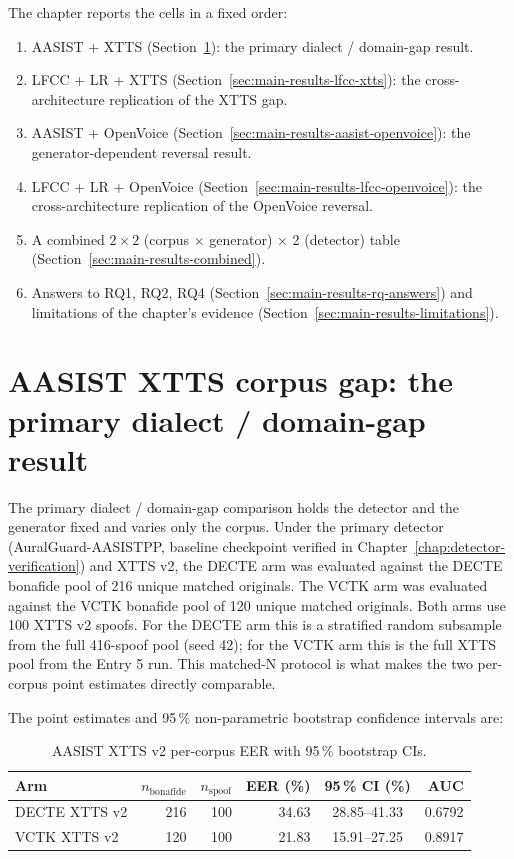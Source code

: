 The chapter reports the cells in a fixed order:

\begin{enumerate}
    \item AASIST + XTTS (Section~\ref{sec:main-results-aasist-xtts}): the primary dialect / domain-gap
        result.
    \item LFCC + LR + XTTS (Section~\ref{sec:main-results-lfcc-xtts}): the cross-architecture
        replication of the XTTS gap.
    \item AASIST + OpenVoice (Section~\ref{sec:main-results-aasist-openvoice}): the generator-dependent
        reversal result.
    \item LFCC + LR + OpenVoice (Section~\ref{sec:main-results-lfcc-openvoice}): the cross-architecture
        replication of the OpenVoice reversal.
    \item A combined $2 \times 2$ (corpus $\times$ generator) $\times$ 2 (detector) table
        (Section~\ref{sec:main-results-combined}).
    \item Answers to RQ1, RQ2, RQ4 (Section~\ref{sec:main-results-rq-answers}) and limitations of the
        chapter's evidence (Section~\ref{sec:main-results-limitations}).
\end{enumerate}


\section{AASIST XTTS corpus gap: the primary dialect / domain-gap result}
\label{sec:main-results-aasist-xtts}

The primary dialect / domain-gap comparison holds the detector and
the generator fixed and varies only the corpus. Under the primary
detector (AuralGuard-AASISTPP, baseline checkpoint verified in
Chapter~\ref{chap:detector-verification}) and XTTS v2, the DECTE arm was evaluated against the
DECTE bonafide pool of 216 unique matched originals. The VCTK arm
was evaluated against the VCTK bonafide pool of 120 unique matched
originals. Both arms use 100 XTTS v2 spoofs. For the DECTE arm this
is a stratified random subsample from the full 416-spoof pool
(seed 42); for the VCTK arm this is the full XTTS pool from the
Entry 5 run. This matched-N protocol is what makes the two
per-corpus point estimates directly comparable.

The point estimates and 95\,\% non-parametric bootstrap confidence
intervals are:

\begin{table}[t]
\centering
\caption{AASIST XTTS v2 per-corpus EER with 95\,\% bootstrap CIs.}
\label{tab:main-results-aasist-xtts}
\begin{tabularx}{\linewidth}{X r r r c r}
\toprule
\textbf{Arm} & \textbf{$n_\text{bonafide}$} & \textbf{$n_\text{spoof}$} & \textbf{EER (\%)} & \textbf{95\,\% CI (\%)} & \textbf{AUC} \\
\midrule
DECTE XTTS v2 & 216 & 100 & 34.63 & 28.85--41.33 & 0.6792 \\
VCTK XTTS v2  & 120 & 100 & 21.83 & 15.91--27.25 & 0.8917 \\
\bottomrule
\end{tabularx}
\end{table}

